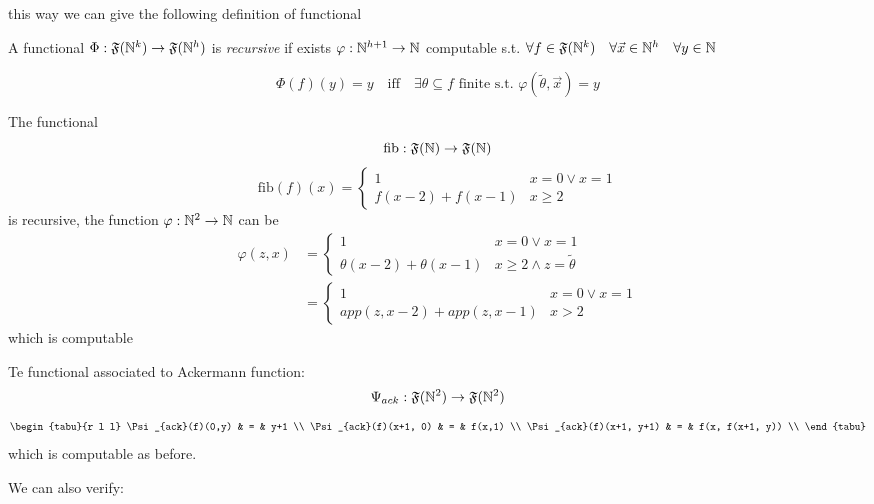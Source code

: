 this way we can give the following definition of functional

\begin{definition}
  A functional
  $\Phi : \mathfrak{F}(\mathbb{N}^k) \rightarrow \mathfrak{F}(\mathbb{N}^h)$ is
  \emph{recursive} if exists $\varphi : \mathbb{N}^{h+1} \rightarrow \mathbb{N}$
  computable s.t.
  $\forall f \in \mathfrak{F}(\mathbb{N}^k) \quad \forall \vec{x} \in \mathbb{N}^h
  \quad \forall y \in \mathbb{N}$

  \[
    \Phi(f)(y) = y \quad \mbox{iff} \quad \exists \theta \subseteq f
    \mbox{ finite s.t. } \varphi(\tilde{\theta}, \vec{x}) = y
  \]
\end{definition}

\begin{example}
  The functional
  \newcommand{\fib}[1]{\ensuremath{\mbox{fib}(#1)}}
  \[
    \mbox{fib} : \mathfrak{F}(\mathbb{N}) \rightarrow \mathfrak{F}(\mathbb{N})
  \]
  \[
    \fib{f}(x) = \begin{cases}
      1 & x=0 \lor x=1 \\
      f(x-2) + f(x-1) & x \geq 2
    \end{cases}
  \]
  is recursive, the function $\varphi: \mathbb{N}^2 \rightarrow \mathbb{N}$ can be
  \[
    \begin{aligned}
      \varphi(z, x) &= \begin{cases}
        1 & x=0 \lor x=1 \\
        \theta(x-2) + \theta(x-1) & x \geq 2 \land z = \tilde{\theta}
      \end{cases} \\
      &= \begin{cases}
        1 & x = 0 \lor x = 1 \\
        app(z, x-2) + app(z, x-1) & x > 2
      \end{cases}
    \end{aligned}
  \]
  which is computable
\end{example}

\begin{example}
Te functional associated to Ackermann function:
\[
  \Psi_{ack} : \mathfrak{F}(\mathbb{N}^2) \rightarrow \mathfrak{F}(\mathbb{N}^2)
\]
\[
  \begin{tabu}{r l l}
    \Psi_{ack}(f)(0,y)  & = & y+1 \\
    \Psi_{ack}(f)(x+1, 0) & = & f(x,1) \\
    \Psi_{ack}(f)(x+1, y+1)  & = & f(x, f(x+1, y)) \\
  \end{tabu}
\]
which is computable as before.
\end{example}
We can also verify:

